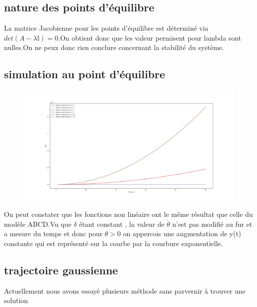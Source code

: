 \documentclass[11pt,a4paper]{article}
\begin{document}
    \subsection{nature des points d'équilibre}
La matrice Jacobienne pour les points d'équilibre est déterminé via
$ det(A-\lambda \mathbb{I})=0 $.On obtient donc que les valeur permisent pour lambda sont nulles.On ne peux donc rien conclure concernant la stabilité du système.
\subsection{simulation au point d'équilibre}



\begin{figure}[!h]
    \centering
    \includegraphics[width=0.5\linewidth]{Q7.png}
\end{figure}
On peut constater que les fonctions non linéaire ont le même résultat que celle du modèle ABCD.Vu que $\delta$ étant constant , la valeur de $\dot \theta$ n'est pas modifié au fur et a mesure du temps et donc pour $\theta>0 $ on appercois une augmentation de y(t) constante qui est représenté sur la courbe par la courbure exponentielle.










\subsection{trajectoire gaussienne}
Actuellement nous avons essayé plusieurs méthode sans parvernir à trouver une solution 
\end{document}
